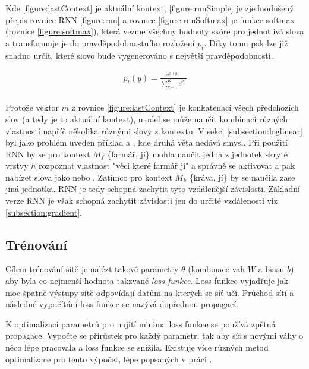 Kde \ref{figure:lastContext} je aktuální kontext, \ref{figure:rnnSimple} je zjednodušený přepis rovnice RNN \ref{figure:rnn} a rovnice \ref{figure:rnnSoftmax} je funkce softmax (rovnice \ref{figure:softmax}), která vezme všechny hodnoty skóre pro jednotlivá slova a transformuje je do pravděpodobnostního rozložení $p_t$. Díky tomu pak lze již snadno určit, které slovo bude vygenerováno s největší pravděpodobností.


\begin{align}\label{figure:softmax}
  p_t(y)={\frac {e^{p_{t}(y)}}{\sum _{k=1}^{K}e^{p_{t_{k}}}}}
\end{align}
\\


Protože vektor $m$ z rovnice \ref{figure:lastContext} je konkatenací všech předchozích slov (a tedy je to aktuální kontext), model se může naučit kombinaci různých vlastností napříč několika různými slovy z kontextu. V sekci \ref{subsection:loglinear} byl jako problém uveden příklad  a , kde druhá věta nedává smysl. Při použití RNN by se pro kontext $M_f$  \{farmář, jí\} mohla naučit jedna z jednotek skryté vrstvy $h$ rozpoznat vlastnost "věci které farmář jí" a správně se aktivovat a pak nabízet slova jako  nebo . Zatímco pro kontext $M_k$ \{kráva, jí\} by se naučila zase jiná jednotka. RNN je tedy schopná zachytit tyto vzdálenější závislosti. Základní verze RNN je však schopná zachytit závislosti jen do určité vzdálenosti viz \ref{subsection:gradient}.


\subsection{Trénování} \label{subsection:training}
Cílem trénování sítě je nalézt takové parametry $\theta$ (kombinace vah $W$ a biasu $b$) aby byla co nejmenší hodnota takzvané \emph{loss funkce}. Loss funkce vyjadřuje jak moc špatně výstupy sítě odpovídají datům na kterých se síť učí. Průchod sítí a následné vypočítání loss funkce se nazývá dopřednou propagací.



K optimalizaci parametrů pro najití minima loss funkce se používá zpětná propagace. Vypočte se přírůstek pro každý parametr, tak aby síť s novými váhy o něco lépe pracovala a loss funkce se snížila. Existuje více různých metod optimalizace pro tento výpočet, lépe popsaných v práci \cite{gradientDescent}.

